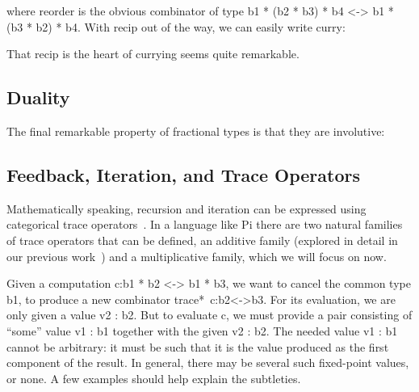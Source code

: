 \documentclass{llncs}
\newcommand{\dgm}[2][1.5]{
\begin{center}
\scalebox{#1}{
\texttt{[image: diagrams/\#2.pdf]}
}
\end{center}
}
\begin{document}

\noindent
where {{reorder}} is the obvious combinator of type {{b1 * (b2 * b3) * b4 <-> b1 * (b3 * b2) * b4}}.
With {{recip}} out of the way, we can easily write {{curry}}:

\noindent That {{recip}} is the heart of currying seems quite remarkable.
\subsection{Duality}

The final remarkable property of fractional types is that they
are involutive:



\subsection{Feedback, Iteration, and Trace Operators}

Mathematically speaking, recursion and iteration can be expressed using
categorical trace
operators~\cite{joyal1996traced,Hasegawa:1997:RCS:645893.671607}.  In a
language like {{Pi}} there are two natural families of trace operators
that can be defined, an additive family (explored in detail in our previous
work~\cite{rc2011}) and a multiplicative family, which we will focus on now.

Given a computation {{c:b1 * b2 <-> b1 * b3}}, we
want to cancel the common type {{b1}}, to produce a new combinator
{{trace*~c:b2<->b3}}. For its evaluation, we are only
given a value {{v2 : b2}}. But to evaluate {{c}}, we must provide a pair
consisting of ``some'' value {{v1 : b1}} together with the given {{v2 : b2}}.
The needed value {{v1 : b1}} cannot be arbitrary: it must be such that it
is the value produced as the first component of the result.  In general, there
may be several such fixed-point values, or none.  A few examples should help
explain the subtleties.
\end{document}
